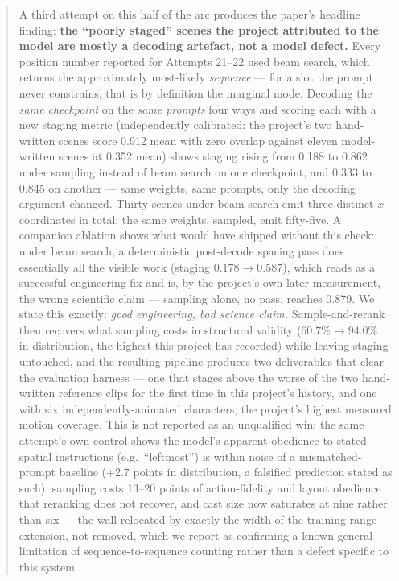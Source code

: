 \documentclass[11pt]{article}
\begin{document}
\begin{abstract}
A third attempt on this half of the arc produces the paper's headline
finding: \textbf{the ``poorly staged'' scenes the project attributed to
the model are mostly a decoding artefact, not a model defect.} Every
position number reported for Attempts 21--22 used beam search, which
returns the approximately most-likely \emph{sequence} --- for a slot the
prompt never constrains, that is by definition the marginal mode. Decoding
the \emph{same checkpoint} on the \emph{same prompts} four ways and
scoring each with a new staging metric (independently calibrated: the
project's two hand-written scenes score 0.912 mean with zero overlap
against eleven model-written scenes at 0.352 mean) shows staging rising
from 0.188 to 0.862 under sampling instead of beam search on one
checkpoint, and 0.333 to 0.845 on another --- same weights, same prompts,
only the decoding argument changed. Thirty scenes under beam search emit
three distinct $x$-coordinates in total; the same weights, sampled, emit
fifty-five. A companion ablation shows what would have shipped without
this check: under beam search, a deterministic post-decode spacing pass
does essentially all the visible work (staging $0.178 \rightarrow 0.587$),
which reads as a successful engineering fix and is, by the project's own
later measurement, the wrong scientific claim --- sampling alone, no pass,
reaches 0.879. We state this exactly: \emph{good engineering, bad science
claim.} Sample-and-rerank then recovers what sampling costs in structural
validity ($60.7\% \rightarrow 94.0\%$ in-distribution, the highest this
project has recorded) while leaving staging untouched, and the resulting
pipeline produces two deliverables that clear the evaluation harness ---
one that stages above the worse of the two hand-written reference clips
for the first time in this project's history, and one with six
independently-animated characters, the project's highest measured motion
coverage. This is not reported as an unqualified win: the same attempt's
own control shows the model's apparent obedience to stated spatial
instructions (e.g.\ ``leftmost'') is within noise of a mismatched-prompt
baseline (+2.7 points in distribution, a falsified prediction stated as
such), sampling costs 13--20 points of action-fidelity and layout
obedience that reranking does not recover, and cast size now saturates at
nine rather than six --- the wall relocated by exactly the width of the
training-range extension, not removed, which we report as confirming a
known general limitation of sequence-to-sequence counting rather than a
defect specific to this system.


\end{abstract}
\end{document}
